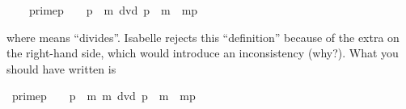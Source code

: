 %
\begin{isabellebody}%
\isanewline
\ \ \ \ {\isachardoublequote}prime{\isacharparenleft}p{\isacharparenright}\ {\isasymequiv}\ \ {\isacharless}\ p\ {\isasymand}\ {\isacharparenleft}m\ dvd\ p\ {\isasymlongrightarrow}\ {\isacharparenleft}m{\isacharequal}\ {\isasymor}\ m{\isacharequal}p{\isacharparenright}{\isacharparenright}{\isachardoublequote}%
\begin{isamarkuptext}%
\noindent\small
where  means ``divides''.
Isabelle rejects this ``definition'' because of the extra  on the
right-hand side, which would introduce an inconsistency (why?). What you
should have written is%
\end{isamarkuptext}%
\ {\isachardoublequote}prime{\isacharparenleft}p{\isacharparenright}\ {\isasymequiv}\ \ {\isacharless}\ p\ {\isasymand}\ {\isacharparenleft}{\isasymforall}m{\isachardot}\ m\ dvd\ p\ {\isasymlongrightarrow}\ {\isacharparenleft}m{\isacharequal}\ {\isasymor}\ m{\isacharequal}p{\isacharparenright}{\isacharparenright}{\isachardoublequote}\end{isabellebody}%
